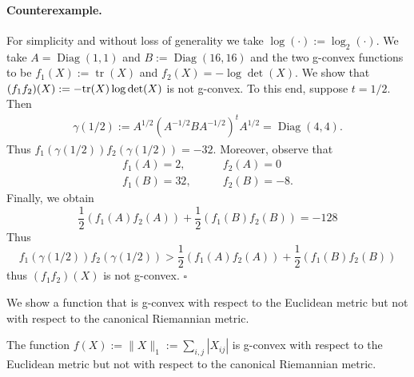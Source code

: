 \documentclass[twoside,11pt]{article}
\begin{document}
\paragraph{Counterexample.}
For simplicity and without loss of generality we take $\log(\cdot) := \log_2(\cdot)$. We take $A = \operatorname{Diag}(1,1)$ and $B := \operatorname{Diag}(16, 16)$ and the two g-convex functions to be $f_1(X):= \operatorname{tr}(X)$ and $f_2(X) = - \log \det (X)$. We show that $(f_1 f_2)(X) := -\text{tr}(X) \log \det(X)$ is not g-convex. To this end, suppose $t=1/2$. Then 
\[
\begin{aligned}
    \gamma(1/2) := A^{1/2}\left(A^{-1/2} B A^{-1/2}\right)^t A^{1/2} = \operatorname{Diag}(4, 4).
\end{aligned}
\]
Thus $f_1(\gamma(1/2)) f_2(\gamma(1/2)) = - 32.$ Moreover, observe that 
\[
\begin{aligned}
    f_1(A) = 2, \qquad & f_2(A) = 0 
    \\f_1(B) = 32, \qquad & f_2(B) = -8.
\end{aligned}
\]
Finally, we obtain 
\[
\frac{1}{2}\left(f_1(A) f_2(A) \right) + \frac{1}{2}\left(f_1(B) f_2(B) \right) = -128
\]
Thus 
\[
f_1(\gamma(1/2)) f_2(\gamma(1/2)) > \frac{1}{2}\left(f_1(A) f_2(A) \right) + \frac{1}{2}\left(f_1(B) f_2(B)\right) 
\]
thus $(f_1 f_2)(X)$ is not g-convex.
\hfill $\square$



We show a function that is g-convex with respect to the Euclidean metric but not with respect to the canonical Riemannian metric.


\begin{prop}
    The function  $f(X) := \|X\|_1 := \sum_{i,j} |X_{ij}|$ is g-convex with respect to the Euclidean metric but not with respect to the canonical Riemannian metric.
\end{prop}
\end{document}
